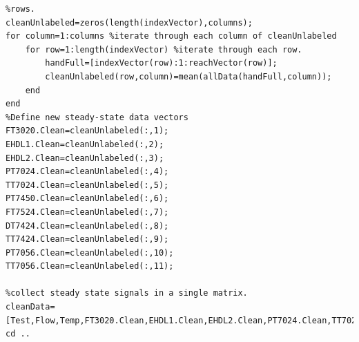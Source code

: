 \documentclass{report}
\begin{document}
\begin{verbatim}
%rows.
cleanUnlabeled=zeros(length(indexVector),columns);
for column=1:columns %iterate through each column of cleanUnlabeled
    for row=1:length(indexVector) %iterate through each row.
        handFull=[indexVector(row):1:reachVector(row)];
        cleanUnlabeled(row,column)=mean(allData(handFull,column));
    end
end
%Define new steady-state data vectors
FT3020.Clean=cleanUnlabeled(:,1);
EHDL1.Clean=cleanUnlabeled(:,2);
EHDL2.Clean=cleanUnlabeled(:,3);
PT7024.Clean=cleanUnlabeled(:,4);
TT7024.Clean=cleanUnlabeled(:,5);
PT7450.Clean=cleanUnlabeled(:,6);
FT7524.Clean=cleanUnlabeled(:,7);
DT7424.Clean=cleanUnlabeled(:,8);
TT7424.Clean=cleanUnlabeled(:,9);
PT7056.Clean=cleanUnlabeled(:,10);
TT7056.Clean=cleanUnlabeled(:,11);

%collect steady state signals in a single matrix.
cleanData=[Test,Flow,Temp,FT3020.Clean,EHDL1.Clean,EHDL2.Clean,PT7024.Clean,TT7024.Clean,PT7450.Clean,FT7524.Clean,DT7424.Clean,TT7424.Clean,PT7056.Clean,TT7056.Clean];
cd ..


\end{verbatim}
\end{document}
